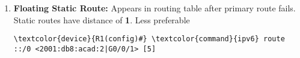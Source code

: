 \documentclass[10pt, a4paper, onecolumn, oneside, titlepage, openany]{book}
\begin{document}
\begin{enumerate}
\begin{itemize}
\begin{Verbatim}[commandchars=\\\{\}]
<2001:db8:acad:0::2|G0/0/1>
\end{Verbatim}
        \item \textbf{Fully Specified Static Route}
\begin{Verbatim}[commandchars=\\\{\}]
\textcolor{device}{R1(config)#} \textcolor{command}{ipv6} route <2001:db8:acad:2::/64>
<G0/0/1 2001:db8:acad:0::2>
\end{Verbatim}
    \item \textbf{Default Static Route:}
\begin{Verbatim}[commandchars=\\\{\}]
\textcolor{device}{R1(config)#} \textcolor{command}{ipv6} route ::/0 <2001:db8:acad:2|G0/0/1>
\end{Verbatim}
    \end{itemize}
    \item \textbf{Floating Static Route:}
\newline Appears in routing table after primary route fails.
\newline Static routes have distance of \textbf{1}. Less preferable
\begin{Verbatim}[commandchars=\\\{\}]
\textcolor{device}{R1(config)#} \textcolor{command}{ipv6} route ::/0 <2001:db8:acad:2|G0/0/1> [5]
\end{Verbatim}
\end{enumerate}
\end{document}
